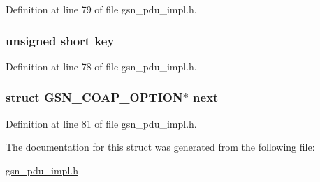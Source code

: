 Definition at line 79 of file gsn\_\-pdu\_\-impl.h.

\hypertarget{a00041_ad42a2de4cc8381513f980278161372bb}{
\subsubsection[{key}]{\setlength{\rightskip}{0pt plus 5cm}unsigned short {\bf key}}}
\label{a00041_ad42a2de4cc8381513f980278161372bb}


Definition at line 78 of file gsn\_\-pdu\_\-impl.h.

\hypertarget{a00041_a2aab167b023fbc15a158b9bf6d1effe3}{
\subsubsection[{next}]{\setlength{\rightskip}{0pt plus 5cm}struct {\bf GSN\_\-COAP\_\-OPTION}$\ast$ {\bf next}}}
\label{a00041_a2aab167b023fbc15a158b9bf6d1effe3}


Definition at line 81 of file gsn\_\-pdu\_\-impl.h.



The documentation for this struct was generated from the following file:\begin{DoxyCompactItemize}
\item 
\hyperlink{a00538}{gsn\_\-pdu\_\-impl.h}\end{DoxyCompactItemize}
